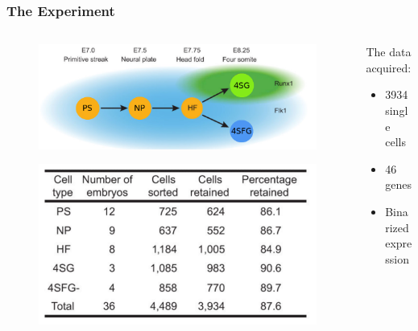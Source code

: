 \documentclass{beamer}
\begin{document}
\begin{frame}
	\frametitle{The Experiment}
	\begin{columns}[T] %
		\begin{column}{.48\textwidth}
			\begin{figure}
				\includegraphics*[width=  \linewidth]{./images/sampling.png}
			\end{figure}
			\begin{figure}
				\includegraphics*[width=  \linewidth]{./images/numbers.png}
			\end{figure}
		\end{column}%
		\hfill%
		\begin{column}{.48\textwidth}
			The data acquired:\\
			\begin{itemize}
				\item 3934 single cells
				\item 46 genes
				\item Binarized expression
			\end{itemize}
		\end{column}%
	\end{columns}
\end{frame}
\end{document}
